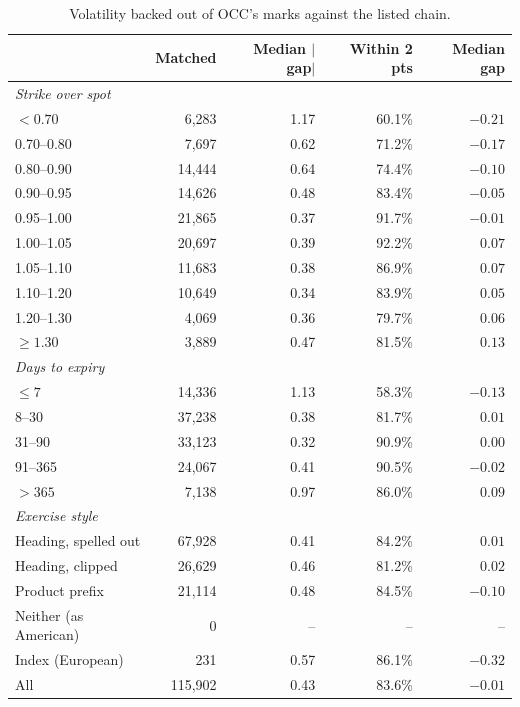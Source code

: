 \begin{table}[t]
\centering
\caption{Volatility backed out of OCC's marks against the listed chain.}
\label{tab:implied}
\begin{tabular}{lrrrr}
\toprule
 & Matched & Median $|$gap$|$ & Within 2 pts & Median gap \\
\midrule
\textit{Strike over spot} &  &  &  &  \\
$<0.70$ & 6,283 & 1.17 & 60.1\% & $-0.21$ \\
0.70--0.80 & 7,697 & 0.62 & 71.2\% & $-0.17$ \\
0.80--0.90 & 14,444 & 0.64 & 74.4\% & $-0.10$ \\
0.90--0.95 & 14,626 & 0.48 & 83.4\% & $-0.05$ \\
0.95--1.00 & 21,865 & 0.37 & 91.7\% & $-0.01$ \\
1.00--1.05 & 20,697 & 0.39 & 92.2\% & $0.07$ \\
1.05--1.10 & 11,683 & 0.38 & 86.9\% & $0.07$ \\
1.10--1.20 & 10,649 & 0.34 & 83.9\% & $0.05$ \\
1.20--1.30 & 4,069 & 0.36 & 79.7\% & $0.06$ \\
$\geq 1.30$ & 3,889 & 0.47 & 81.5\% & $0.13$ \\
\textit{Days to expiry} &  &  &  &  \\
$\leq 7$ & 14,336 & 1.13 & 58.3\% & $-0.13$ \\
8--30 & 37,238 & 0.38 & 81.7\% & $0.01$ \\
31--90 & 33,123 & 0.32 & 90.9\% & $0.00$ \\
91--365 & 24,067 & 0.41 & 90.5\% & $-0.02$ \\
$>365$ & 7,138 & 0.97 & 86.0\% & $0.09$ \\
\textit{Exercise style} &  &  &  &  \\
Heading, spelled out & 67,928 & 0.41 & 84.2\% & $0.01$ \\
Heading, clipped & 26,629 & 0.46 & 81.2\% & $0.02$ \\
Product prefix & 21,114 & 0.48 & 84.5\% & $-0.10$ \\
Neither (as American) & 0 & -- & -- & -- \\
Index (European) & 231 & 0.57 & 86.1\% & $-0.32$ \\
All & 115,902 & 0.43 & 83.6\% & $-0.01$ \\
\bottomrule
\end{tabular}
\par{}
\end{table}

